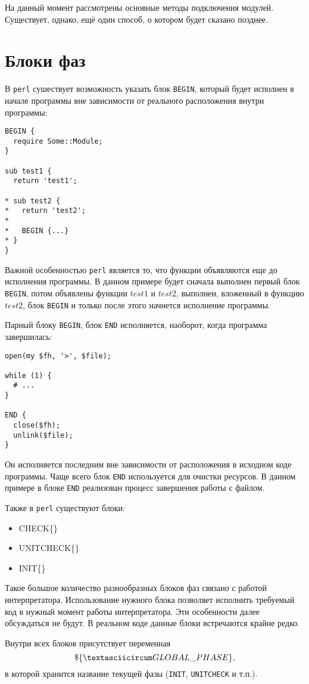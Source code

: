 На данный момент рассмотрены основные методы подключения модулей.
Существует, однако, ещё один способ, о котором будет сказано позднее.

\section{Блоки фаз} %
В \verb|perl| сушествует возможность указать блок \verb|BEGIN|, который будет исполнен в начале программы вне зависимости от реального расположения внутри программы:
\begin{verbatim}
BEGIN {
  require Some::Module;
}

sub test1 {
  return 'test1';

* sub test2 {
*   return 'test2';
*
*   BEGIN {...}
* }
}
\end{verbatim}
Важной особенностью \verb|perl| является то, что функции объявляются еще до исполнения программы. В данном примере будет сначала выполнен первый блок \verb|BEGIN|, потом объявлены функции $test1$ и $test2$, выполнен, вложенный в функцию $test2$, блок \verb|BEGIN| и только после этого начнется исполнение программы.

Парный блоку \verb|BEGIN|, блок \verb|END| исполняется, наоборот, когда программа завершилась:
\begin{verbatim}
open(my $fh, '>', $file);

while (1) {
  # ...
}

END {
  close($fh);
  unlink($file);
}
\end{verbatim}
Он исполняется последним вне зависимости от расположения в исходном коде программы. Чаще всего блок \verb|END| используется для очистки ресурсов. В данном примере в блоке \verb|END| реализован процесс завершения работы с файлом.

Также в \verb|perl| существуют блоки:
\begin{itemize}
	\item CHECK\{\}
	\item UNITCHECK\{\}
	\item INIT\{\}
\end{itemize}
Такое большое количество разнообразных блоков фаз связано с работой интерпретатора. Использование нужного блока позволяет исполнить требуемый код в нужный момент работы интерпретатора. Эти особенности далее обсуждаться не будут. В реальном коде данные блоки встречаются крайне редко.

Внутри всех блоков присутствует переменная
\[ \$\{ \textasciicircum GLOBAL \_ PHASE \}, \]
в которой хранится название текущей фазы (\verb|INIT|, \verb|UNITCHECK| и т.п.).

